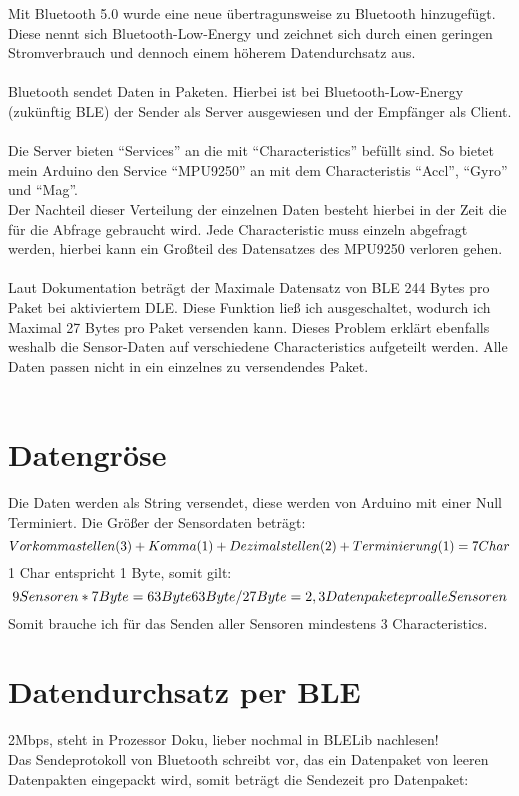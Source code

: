 Mit Bluetooth 5.0 wurde eine neue übertragunsweise zu 
Bluetooth hinzugefügt. Diese nennt sich Bluetooth-Low-Energy und zeichnet
sich durch einen geringen Stromverbrauch und dennoch einem höherem 
Datendurchsatz aus. \\
\\
Bluetooth sendet Daten in Paketen. Hierbei ist bei Bluetooth-Low-Energy
(zukünftig BLE) der Sender als Server ausgewiesen und der Empfänger als Client.\\
\\
Die Server bieten ``Services'' an die mit ``Characteristics'' befüllt sind.
So bietet mein Arduino den Service ``MPU9250'' an mit dem Characteristis ``Accl'', ``Gyro''
und ``Mag''.\\
Der Nachteil dieser Verteilung der einzelnen Daten besteht hierbei in der Zeit die für die
Abfrage gebraucht wird. Jede Characteristic muss einzeln abgefragt werden, hierbei kann ein
Großteil des Datensatzes des MPU9250 verloren gehen.\\
\\
Laut Dokumentation beträgt der Maximale Datensatz von BLE 244 Bytes pro Paket bei 
aktiviertem DLE. Diese Funktion ließ ich ausgeschaltet, wodurch ich Maximal
27 Bytes pro Paket versenden kann. Dieses Problem erklärt ebenfalls weshalb die Sensor-Daten
auf verschiedene Characteristics aufgeteilt werden. Alle Daten passen nicht in ein einzelnes
zu versendendes Paket. \\
\\

\section{Datengröse}
Die Daten werden als String versendet, diese werden von Arduino mit einer
Null Terminiert. Die Größer der Sensordaten beträgt:
\begin{equation}
    $$
Vorkommastellen (3) + Komma (1) + Dezimalstellen (2) + Terminierung (1) = 7 Char
$$
\end{equation}
1 Char entspricht 1 Byte, somit gilt:
\begin{equation}$$
9 Sensoren * 7 Byte = 63 Byte \\
63 Byte / 27 Byte = 2,3 Datenpakete pro alle Sensoren
$$
\end{equation}
Somit brauche ich für das Senden aller Sensoren mindestens 3 Characteristics.


\section{Datendurchsatz per BLE}
2Mbps, steht in Prozessor Doku, lieber nochmal in BLELib nachlesen!
\\
Das Sendeprotokoll von Bluetooth schreibt vor, das ein Datenpaket von
leeren Datenpakten eingepackt wird, somit beträgt die Sendezeit pro 
Datenpaket:

